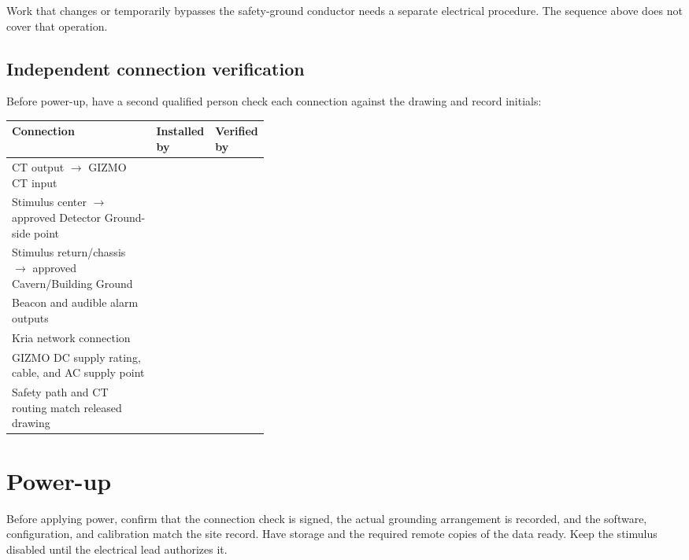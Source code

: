 \documentclass[11pt]{article}
\newcommand{\GIZMO}{\textsc{GIZMO}}
\begin{document}
Work that changes or temporarily bypasses the safety-ground conductor needs a separate electrical procedure. The sequence above does not cover that operation.

\subsection{Independent connection verification}

Before power-up, have a second qualified person check each connection against the drawing and record initials:

\begin{center}
\begin{tabularx}{0.94\linewidth}{@{}Y L{0.19\linewidth} L{0.19\linewidth}@{}}
\toprule
Connection & Installed by & Verified by \\
\midrule
CT output $\rightarrow$ \GIZMO{} CT input & & \\
Stimulus center $\rightarrow$ approved Detector Ground-side point & & \\
Stimulus return/chassis $\rightarrow$ approved Cavern/Building Ground & & \\
Beacon and audible alarm outputs & & \\
Kria network connection & & \\
GIZMO DC supply rating, cable, and AC supply point & & \\
Safety path and CT routing match released drawing & & \\
\bottomrule
\end{tabularx}
\end{center}

\section{Power-up}

Before applying power, confirm that the connection check is signed, the actual grounding arrangement is recorded, and the software, configuration, and calibration match the site record. Have storage and the required remote copies of the data ready. Keep the stimulus disabled until the electrical lead authorizes it.
\end{document}
